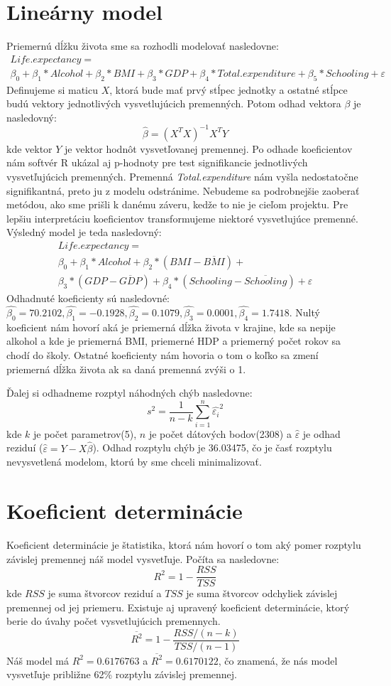 \section*{Lineárny model}
Priemernú dĺžku života sme sa rozhodli modelovať nasledovne:
\[
    \begin{array}{c}
    Life.expectancy =\\
     \beta_0 + \beta_1*Alcohol + \beta_2*BMI + \beta_3*GDP + \beta_4*Total.expenditure + \beta_5*Schooling + \varepsilon
    \end{array}
\]  
Definujeme si maticu $X$, ktorá bude mať prvý stĺpec jednotky a ostatné stĺpce budú vektory jednotlivých
vysvetlujúcich premenných. Potom odhad vektora $\beta$ je nasledovný:
\[
    \hat{\beta} = (X^TX)^{-1}X^TY  
\]
kde vektor $Y$ je vektor hodnôt vysvetľovanej premennej. Po odhade koeficientov nám softvér R ukázal aj p-hodnoty pre test signifikancie jednotlivých vysvetľujúcich premenných.
Premenná \textit{Total.expenditure} nám vyšla nedostatočne signifikantná, preto ju z modelu odstránime. Nebudeme sa podrobnejšie zaoberať metódou, ako sme prišli k danému záveru, kedže to nie je cieľom projektu.
Pre lepšiu interpretáciu koeficientov transformujeme niektoré vysvetlujúce premenné. Výsledný model je teda nasledovný:
\[
    \begin{array}{c}
    Life.expectancy = \\
    \beta_0 + \beta_1*Alcohol + \beta_2*(BMI-\overline{BMI}) + \\
    \beta_3*(GDP-\overline{GDP}) + \beta_4*(Schooling-\overline{Schooling}) + \varepsilon
    \end{array}
\]
Odhadnuté koeficienty sú nasledovné: $\hat{\beta_0}=70.2102, \hat{\beta_1}= -0.1928, \hat{\beta_2}=0.1079,  \hat{\beta_3}=0.0001, \hat{\beta_4}=1.7418$. Nultý koeficient nám hovorí
aká je priemerná dĺžka života v krajine, kde sa nepije alkohol a kde je priemerná BMI, priemerné HDP a priemerný počet rokov sa chodí do školy. Ostatné koeficienty nám hovoria o tom o koľko sa zmení priemerná dĺžka života ak sa daná premenná zvýši o 1.

Ďalej si odhadneme rozptyl náhodných chýb nasledovne:
\[
    s^2  = \frac{1}{n-k}\sum_{i=1}^{n}{\hat{\varepsilon_i}^2}
\]
kde $k$ je počet parametrov(5), $n$ je počet dátových bodov(2308) a $\hat{\varepsilon}$ je odhad reziduí ($\hat{\varepsilon} = Y - X\hat{\beta}$). 
Odhad rozptylu chýb je 36.03475, čo je časť rozptylu nevysvetlená modelom, ktorú by sme chceli minimalizovať.

\section*{Koeficient determinácie}
Koeficient determinácie je štatistika, ktorá nám hovorí o tom aký pomer rozptylu závislej premennej náš model vysvetľuje.
Počíta sa nasledovne:
\[
    R^2 = 1 - \frac{RSS}{TSS}  
\]
kde $RSS$ je suma štvorcov reziduí a $TSS$ je suma štvorcov odchyliek závislej premennej od jej priemeru.
Existuje aj upravený koeficient determinácie, ktorý berie do úvahy počet vysvetlujúcich premennych.
\[
  \overline{R^2} = 1 - \frac{RSS/(n-k)}{TSS/(n-1)}  
\]
Náš model má $R^2 = 0.6176763$ a $\overline{R^2} = 0.6170122$, čo znamená, že nás model vysvetľuje približne 62\% rozptylu závislej premennej.

